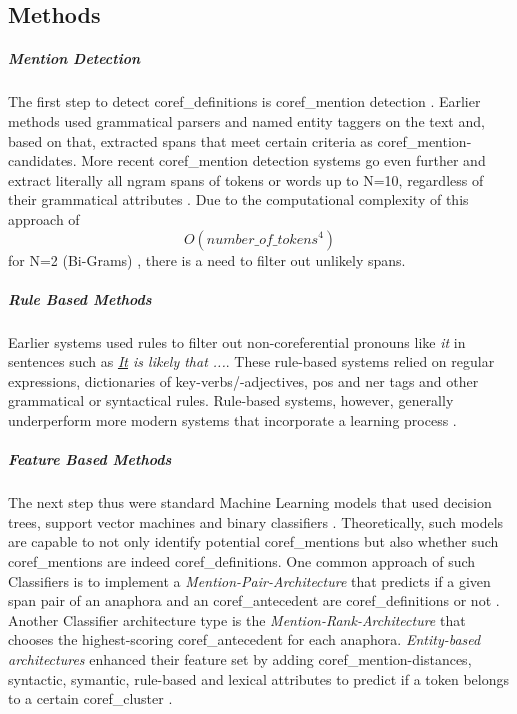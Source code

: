 \subsection{Methods}\label{subsec:methods}
\subparagraph{Mention Detection}
The first step to detect \glspl{coref_definition} is \gls{coref_mention} detection \cite{StanfordNLPCoref}.
Earlier methods used grammatical parsers and named entity taggers on the text and, based on that, extracted
\glspl{span} that meet certain criteria as \gls{coref_mention}-candidates.
More recent \gls{coref_mention} detection systems go even further and extract literally all \gls{ngram} \glspl{span}
of \glspl{token} or words up to N=10, regardless of their grammatical attributes \cite{StanfordNLPCoref}.
Due to the computational complexity of this approach of
\begin{equation}
    O(number\_of\_tokens^4)
\end{equation}
for N=2 (Bi-Grams) \cite{CorefEndToEnd}, there is a need to filter out unlikely \glspl{span}.

\subparagraph{Rule Based Methods}
Earlier systems used rules to filter out non-coreferential pronouns like \emph{it} in sentences such as \emph{\underline{It} is likely that ...}.
These rule-based systems relied on regular expressions, dictionaries of key-verbs/-adjectives, \gls{pos} and \gls{ner} tags and other grammatical or syntactical rules.
Rule-based systems, however, generally underperform more modern systems that incorporate a learning process \cite{StanfordNLPCoref}.

\subparagraph{Feature Based Methods}
The next step thus were standard Machine Learning models that used decision trees, support vector machines and binary classifiers \cite{CorefSurvey}.
Theoretically, such models are capable to not only identify potential \glspl{coref_mention} but also whether such \glspl{coref_mention} are indeed \glspl{coref_definition}.
One common approach of such Classifiers is to implement a \emph{Mention-Pair-Architecture} that predicts if a given \gls{span} pair of an \gls{anaphora} and an \gls{coref_antecedent} are \glspl{coref_definition} or not \cite{StanfordNLPCoref}.
Another Classifier architecture type is the \emph{Mention-Rank-Architecture} that chooses the highest-scoring \gls{coref_antecedent} for each \gls{anaphora}.
\emph{Entity-based architectures} enhanced their feature set by adding \gls{coref_mention}-distances, syntactic, symantic, rule-based and lexical attributes to predict if a \gls{token} belongs to a certain \gls{coref_cluster} \cite{ClarkManning2015}.

